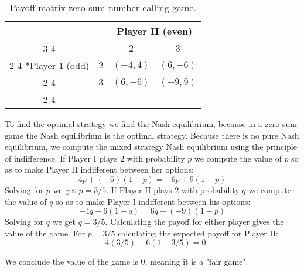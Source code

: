\documentclass{article}
\begin{document}
\begin{table}[H]
\centering
  \setlength{\extrarowheight}{2pt}
  \begin{tabular}{*{4}{c|}}
    \multicolumn{2}{c}{} & \multicolumn{2}{c}{Player II (even)}\\\cline{3-4}
    \multicolumn{1}{c}{} &  & $2$  & $3$ \\\cline{2-4}
    \multirow{2}*{Player 1 (odd)}  & $2$ & $(-4,4)$ & $(6,-6)$ \\\cline{2-4}
    & $3$ & $(6,-6)$ & $(-9,9)$ \\\cline{2-4}
  \end{tabular}
\caption{Payoff matrix zero-sum number calling game.}
\end{table}

To find the optimal strategy we find the Nash equilibrium, because in a zero-sum game the Nash equilibrium is the optimal strategy. Because there is no pure Nash equilibrium, we compute the mixed strategy Nash equilibrium using the principle of indifference. If Player I plays $2$ with probability $p$ we compute the value of $p$ so as to make Player II indifferent between her options:
\[ 4p + (-6)(1 - p) = -6p + 9(1 - p) \]
Solving for $p$ we get $p = 3/5$. If Player II plays $2$ with probability $q$ we compute the value of $q$ so as to make Player I indifferent between his options:
\[ -4q + 6(1 - q) = 6q + (-9)(1 - p) \]
Solving for $q$ we get $q = 3/5$. Calculating the payoff for either player gives the value of the game. For $p= 3/5$ calculating the expected payoff for Player II:
\[ -4(3/5) + 6(1 - 3/5) = 0 \]

We conclude the value of the game is 0, meaning it is a "fair game".
\end{document}
